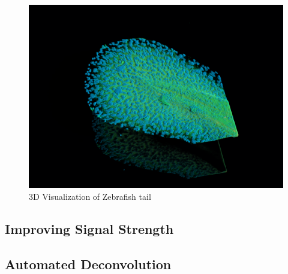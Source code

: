 \documentclass{article}
\begin{document}
\begin{figure}[h!]
    \centering
    \includegraphics[width=0.75\linewidth]{Report/Images/6.4-9/image_3.png}
    \caption{3D Visualization of Zebrafish tail}
    \label{fig:zebrafish_tail}
\end{figure}
\subsection*{Improving Signal Strength}
\subsection*{Automated Deconvolution}
\end{document}
